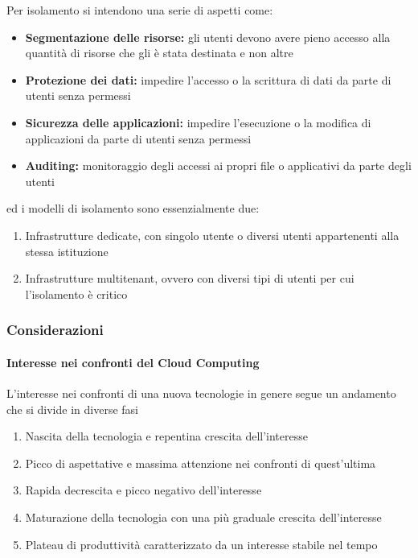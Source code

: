 \documentclass[italian,]{article}
\providecommand{\tightlist}{%
  \setlength{\itemsep}{0pt}\setlength{\parskip}{0pt}}
\let\oldparagraph\paragraph
\renewcommand{\paragraph}[1]{\oldparagraph{#1}\mbox{}}
\begin{document}
Per isolamento si intendono una serie di aspetti come:

\begin{itemize}
\tightlist
\item
  \textbf{Segmentazione delle risorse:} gli utenti devono avere pieno
  accesso alla quantità di risorse che gli è stata destinata e non altre
\item
  \textbf{Protezione dei dati:} impedire l'accesso o la scrittura di
  dati da parte di utenti senza permessi
\item
  \textbf{Sicurezza delle applicazioni:} impedire l'esecuzione o la
  modifica di applicazioni da parte di utenti senza permessi
\item
  \textbf{Auditing:} monitoraggio degli accessi ai propri file o
  applicativi da parte degli utenti
\end{itemize}

ed i modelli di isolamento sono essenzialmente due:

\begin{enumerate}
\def\labelenumi{\arabic{enumi}.}
\tightlist
\item
  Infrastrutture dedicate, con singolo utente o diversi utenti
  appartenenti alla stessa istituzione
\item
  Infrastrutture multitenant, ovvero con diversi tipi di utenti per cui
  l'isolamento è critico
\end{enumerate}

\subsubsection{Considerazioni}\label{considerazioni}

\paragraph{Interesse nei confronti del Cloud
Computing}\label{interesse-nei-confronti-del-cloud-computing}

L'interesse nei confronti di una nuova tecnologie in genere segue un
andamento che si divide in diverse fasi

\begin{enumerate}
\def\labelenumi{\arabic{enumi}.}
\tightlist
\item
  Nascita della tecnologia e repentina crescita dell'interesse
\item
  Picco di aspettative e massima attenzione nei confronti di
  quest'ultima
\item
  Rapida decrescita e picco negativo dell'interesse
\item
  Maturazione della tecnologia con una più graduale crescita
  dell'interesse
\item
  Plateau di produttività caratterizzato da un interesse stabile nel
  tempo
\end{enumerate}
\end{document}
